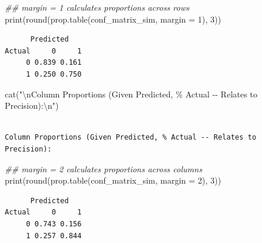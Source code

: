 \documentclass[
  letterpaper,
]{scrbook}
\newenvironment{Shaded}{\begin{snugshade}}{\end{snugshade}}
\newcommand{\AttributeTok}[1]{\textcolor[rgb]{0.40,0.45,0.13}{#1}}
\newcommand{\DecValTok}[1]{\textcolor[rgb]{0.68,0.00,0.00}{#1}}
\newcommand{\DocumentationTok}[1]{\textcolor[rgb]{0.37,0.37,0.37}{\textit{#1}}}
\newcommand{\FunctionTok}[1]{\textcolor[rgb]{0.28,0.35,0.67}{#1}}
\newcommand{\NormalTok}[1]{\textcolor[rgb]{0.00,0.23,0.31}{#1}}
\newcommand{\SpecialCharTok}[1]{\textcolor[rgb]{0.37,0.37,0.37}{#1}}
\newcommand{\StringTok}[1]{\textcolor[rgb]{0.13,0.47,0.30}{#1}}
\begin{document}
\begin{Shaded}
\begin{Highlighting}[]
\DocumentationTok{\#\# margin = 1 calculates proportions across rows}
\FunctionTok{print}\NormalTok{(}\FunctionTok{round}\NormalTok{(}\FunctionTok{prop.table}\NormalTok{(conf\_matrix\_sim, }\AttributeTok{margin =} \DecValTok{1}\NormalTok{), }\DecValTok{3}\NormalTok{))}
\end{Highlighting}
\end{Shaded}

\begin{verbatim}
      Predicted
Actual     0     1
     0 0.839 0.161
     1 0.250 0.750
\end{verbatim}

\begin{Shaded}
\begin{Highlighting}[]
\FunctionTok{cat}\NormalTok{(}\StringTok{"}\SpecialCharTok{\textbackslash{}n}\StringTok{Column Proportions (Given Predicted, \% Actual {-}{-} Relates to Precision):}\SpecialCharTok{\textbackslash{}n}\StringTok{"}\NormalTok{)}
\end{Highlighting}
\end{Shaded}

\begin{verbatim}

Column Proportions (Given Predicted, % Actual -- Relates to Precision):
\end{verbatim}

\begin{Shaded}
\begin{Highlighting}[]
\DocumentationTok{\#\# margin = 2 calculates proportions across columns}
\FunctionTok{print}\NormalTok{(}\FunctionTok{round}\NormalTok{(}\FunctionTok{prop.table}\NormalTok{(conf\_matrix\_sim, }\AttributeTok{margin =} \DecValTok{2}\NormalTok{), }\DecValTok{3}\NormalTok{))}
\end{Highlighting}
\end{Shaded}

\begin{verbatim}
      Predicted
Actual     0     1
     0 0.743 0.156
     1 0.257 0.844
\end{verbatim}
\end{document}
